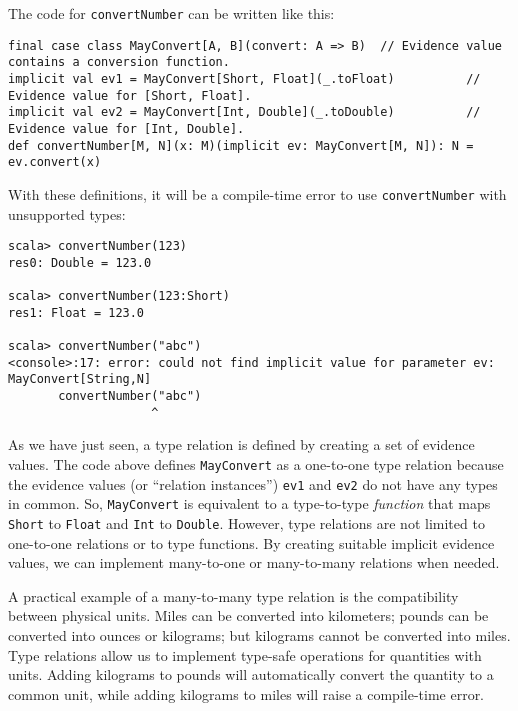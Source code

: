 The code for \lstinline!convertNumber! can be written like this:
\begin{lstlisting}
final case class MayConvert[A, B](convert: A => B)  // Evidence value contains a conversion function.
implicit val ev1 = MayConvert[Short, Float](_.toFloat)          // Evidence value for [Short, Float].
implicit val ev2 = MayConvert[Int, Double](_.toDouble)          // Evidence value for [Int, Double].
def convertNumber[M, N](x: M)(implicit ev: MayConvert[M, N]): N = ev.convert(x)
\end{lstlisting}
With these definitions, it will be a compile-time error to use \lstinline!convertNumber!
with unsupported types:
\begin{lstlisting}
scala> convertNumber(123)
res0: Double = 123.0

scala> convertNumber(123:Short)
res1: Float = 123.0

scala> convertNumber("abc")
<console>:17: error: could not find implicit value for parameter ev: MayConvert[String,N]
       convertNumber("abc")
                    ^
\end{lstlisting}

As we have just seen, a type relation is defined by creating a set
of evidence values. The code above defines \lstinline!MayConvert!
as a one-to-one type relation because the evidence values (or ``relation
instances'') \lstinline!ev1! and \lstinline!ev2! do not have any
types in common. So, \lstinline!MayConvert! is equivalent to a type-to-type
\emph{function} that maps \lstinline!Short! to \lstinline!Float!
and \lstinline!Int! to \lstinline!Double!. However, type relations
are not limited to one-to-one relations or to type functions. By creating
suitable implicit evidence values, we can implement many-to-one or
many-to-many relations when needed. 

A practical example of a many-to-many type
relation is the compatibility between physical units. Miles can be
converted into kilometers; pounds can be converted into ounces or
kilograms; but kilograms cannot be converted into miles. Type relations
allow us to implement type-safe operations for quantities with units.
Adding kilograms to pounds will automatically convert the quantity
to a common unit, while adding kilograms to miles will raise a compile-time
error.

